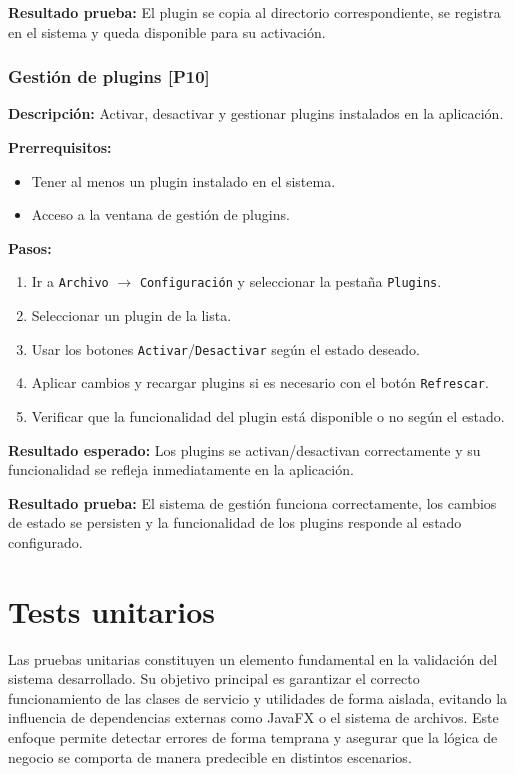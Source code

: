 \documentclass[../../main.tex]{subfiles}
\begin{document}
\textbf{Resultado prueba:} El plugin se copia al directorio correspondiente, se registra en el sistema y queda disponible para su activación.

\subsubsection{Gestión de plugins [P10]}

\textbf{Descripción:} Activar, desactivar y gestionar plugins instalados en la aplicación.

\textbf{Prerrequisitos:} 
\begin{itemize}
\item Tener al menos un plugin instalado en el sistema.
\item Acceso a la ventana de gestión de plugins.
\end{itemize}

\clearpage 

\textbf{Pasos:}
\begin{enumerate}
\item Ir a \lstinline|Archivo| $\rightarrow$ \lstinline|Configuración| y seleccionar la pestaña \lstinline|Plugins|.
\item Seleccionar un plugin de la lista.
\item Usar los botones \lstinline|Activar|/\lstinline|Desactivar| según el estado deseado.
\item Aplicar cambios y recargar plugins si es necesario con el botón \lstinline|Refrescar|.
\item Verificar que la funcionalidad del plugin está disponible o no según el estado.
\end{enumerate}

\textbf{Resultado esperado:} Los plugins se activan/desactivan correctamente y su funcionalidad se refleja inmediatamente en la aplicación.

\textbf{Resultado prueba:} El sistema de gestión funciona correctamente, los cambios de estado se persisten y la funcionalidad de los plugins responde al estado configurado.


\section{Tests unitarios}

Las pruebas unitarias constituyen un elemento fundamental en la validación del sistema desarrollado. Su objetivo principal es garantizar el correcto funcionamiento de las clases de servicio y utilidades de forma aislada, evitando la influencia de dependencias externas como JavaFX o el sistema de archivos. Este enfoque permite detectar errores de forma temprana y asegurar que la lógica de negocio se comporta de manera predecible en distintos escenarios.
\end{document}
